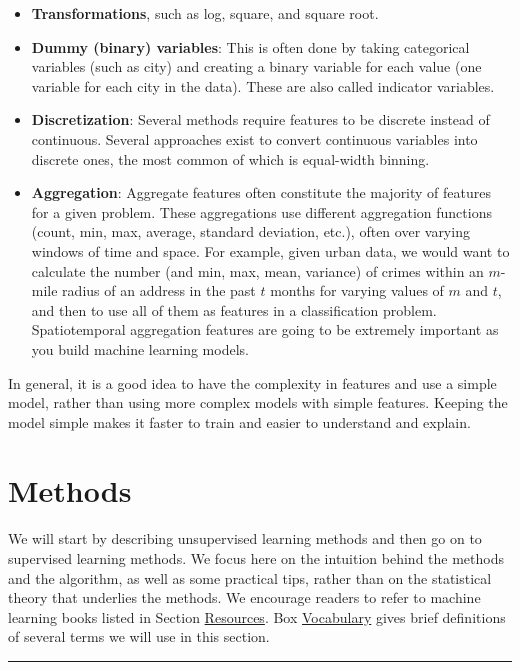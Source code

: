 \documentclass[]{krantz}
\begin{document}
\begin{itemize}
\item
  \textbf{Transformations}, such as log, square, and square root.
\item
  \textbf{Dummy (binary) variables}: This is often done by taking
  categorical variables (such as city) and creating a binary variable
  for each value (one variable for each city in the data). These are
  also called indicator variables.
\item
  \textbf{Discretization}: Several methods require features to be
  discrete instead of continuous. Several approaches exist to convert
  continuous variables into discrete ones, the most common of which is
  equal-width binning.
\item
  \textbf{Aggregation}: Aggregate features often constitute the majority
  of features for a given problem. These aggregations use different
  aggregation functions (count, min, max, average, standard deviation,
  etc.), often over varying windows of time and space. For example,
  given urban data, we would want to calculate the number (and min, max,
  mean, variance) of crimes within an \(m\)-mile radius of an address in
  the past \(t\) months for varying values of \(m\) and \(t\), and then
  to use all of them as features in a classification problem.
  Spatiotemporal aggregation features are going to be extremely
  important as you build machine learning models.
\end{itemize}

In general, it is a good idea to have the complexity in features and use
a simple model, rather than using more complex models with simple
features. Keeping the model simple makes it faster to train and easier
to understand and explain.

\section{Methods}\label{methods}

We will start by describing unsupervised learning methods and then go on
to supervised learning methods. We focus here on the intuition behind
the methods and the algorithm, as well as some practical tips, rather
than on the statistical theory that underlies the methods. We encourage
readers to refer to machine learning books listed in Section
\protect\hyperlink{ml:res}{Resources}. Box
\protect\hyperlink{box:ml3}{Vocabulary} gives brief definitions of
several terms we will use in this section.

\begin{center}\rule{0.5\linewidth}{\linethickness}\end{center}
\end{document}

